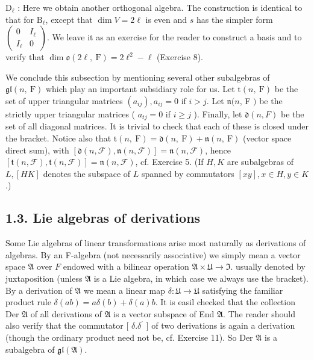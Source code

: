 \documentclass[10pt]{article}
\begin{document}
$\mathrm{D}_{\ell}$ : Here we obtain another orthogonal algebra. The construction is identical to that for $\mathrm{B}_{\ell}$, except that $\operatorname{dim} V=2 \ell$ is even and $s$ has the simpler form $\left(\begin{array}{cc}0 & I_{\ell} \\ I_{\ell} & 0\end{array}\right)$. We leave it as an exercise for the reader to construct a basis and to verify that $\operatorname{dim} \mathfrak{o}(2 \ell, \mathrm{~F})=2 \ell^{2}-\ell$ (Exercise 8).

We conclude this subsection by mentioning several other subalgebras of $\mathfrak{g l}(n, \mathrm{~F})$ which play an important subsidiary role for us. Let $\mathrm{t}(n, \mathrm{~F})$ be the set of upper triangular matrices $\left(a_{i j}\right), a_{i j}=0$ if $i>j$. Let $\mathfrak{n}(n$, F $)$ be the strictly upper triangular matrices ( $a_{t j}=0$ if $i \geq j$ ). Finally, let $\mathfrak{d}(n, F)$ be the set of all diagonal matrices. It is trivial to check that each of these is closed under the bracket. Notice also that $\mathrm{t}(n, \mathrm{~F})=\mathfrak{d}(n, \mathrm{~F})+\mathfrak{n}(n, \mathrm{~F})$ (vector space direct sum), with $[\mathfrak{d}(n, \mathcal{F}), \mathfrak{n}(n, \mathcal{F})]=\mathfrak{n}(n, \mathcal{F})$, hence $[\mathfrak{t}(n, \mathcal{F}), \mathfrak{t}(n, \mathcal{F})]=\mathfrak{n}(n, \mathcal{F})$, cf. Exercise 5. (If $H, K$ are subalgebras of $L,[H K]$ denotes the subspace of $L$ spanned by commutators $[x y], x \in H, y \in K$.)

\subsection*{1.3. Lie algebras of derivations}
Some Lie algebras of linear transformations arise most naturally as derivations of algebras. By an F-algebra (not necessarily associative) we simply mean a vector space $\mathfrak{A}$ over $F$ endowed with a bilinear operation $\mathfrak{A} \times \mathfrak{U} \rightarrow \mathfrak{I}$. usually denoted by juxtaposition (unless $\mathfrak{A}$ is a Lie algebra, in which case we always use the bracket). By a derivation of $\mathfrak{A}$ we mean a linear map $\delta: \mathfrak{U} \rightarrow \mathfrak{U}$ satisfying the familiar product rule $\delta(a b)=a \delta(b)+\delta(a) b$. It is easil checked that the collection Der $\mathfrak{A}$ of all derivations of $\mathfrak{A}$ is a vector subspace of End $\mathfrak{A}$. The reader should also verify that the commutator [ $\delta . \delta^{\prime}$ ] of two derivations is again a derivation (though the ordinary product need not be, cf. Exercise 11). So Der $\mathfrak{A}$ is a subalgebra of $\mathfrak{g l}(\mathfrak{A})$.
\end{document}
